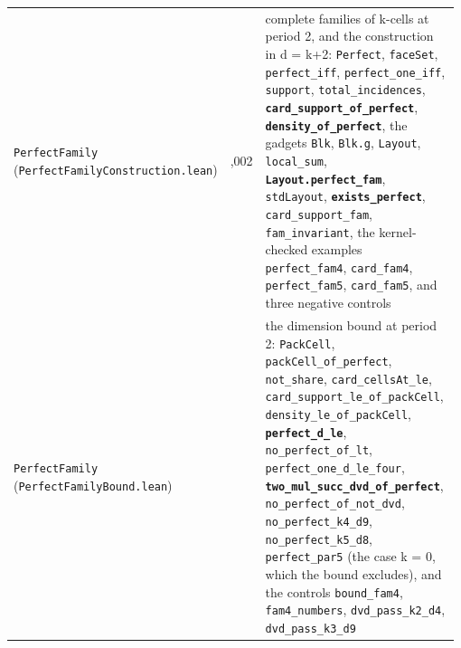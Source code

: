\documentclass[11pt,a4paper]{article}
\theoremstyle{named}
\begin{document}
\begin{small}
\begin{longtable}{>{\raggedright\arraybackslash}p{0.331\linewidth}>{\raggedright\arraybackslash}p{0.05\linewidth}>{\raggedright\arraybackslash}p{0.596\linewidth}}
\texttt{PerfectFamily} (\texttt{PerfectFamilyConstruction.\allowbreak{}lean}) & 1,002 & complete families of k-cells at period 2, and the construction in d = k+2: \texttt{Perfect}, \texttt{faceSet}, \texttt{perfect\_\allowbreak{}iff}, \texttt{perfect\_\allowbreak{}one\_\allowbreak{}iff}, \texttt{support}, \texttt{total\_\allowbreak{}incidences}, \textbf{\texttt{card\_\allowbreak{}support\_\allowbreak{}of\_\allowbreak{}perfect}}, \textbf{\texttt{density\_\allowbreak{}of\_\allowbreak{}perfect}}, the gadgets \texttt{Blk}, \texttt{Blk.\allowbreak{}g}, \texttt{Layout}, \texttt{local\_\allowbreak{}sum}, \textbf{\texttt{Layout.\allowbreak{}perfect\_\allowbreak{}fam}}, \texttt{stdLayout}, \textbf{\texttt{exists\_\allowbreak{}perfect}}, \texttt{card\_\allowbreak{}support\_\allowbreak{}fam}, \texttt{fam\_\allowbreak{}invariant}, the kernel-checked examples \texttt{perfect\_\allowbreak{}fam4}, \texttt{card\_\allowbreak{}fam4}, \texttt{perfect\_\allowbreak{}fam5}, \texttt{card\_\allowbreak{}fam5}, and three negative controls \\
\texttt{PerfectFamily} (\texttt{PerfectFamilyBound.\allowbreak{}lean}) & 642 & the dimension bound at period 2: \texttt{PackCell}, \texttt{packCell\_\allowbreak{}of\_\allowbreak{}perfect}, \texttt{not\_\allowbreak{}share}, \texttt{card\_\allowbreak{}cellsAt\_\allowbreak{}le}, \texttt{card\_\allowbreak{}support\_\allowbreak{}le\_\allowbreak{}of\_\allowbreak{}packCell}, \texttt{density\_\allowbreak{}le\_\allowbreak{}of\_\allowbreak{}packCell}, \textbf{\texttt{perfect\_\allowbreak{}d\_\allowbreak{}le}}, \texttt{no\_\allowbreak{}perfect\_\allowbreak{}of\_\allowbreak{}lt}, \texttt{perfect\_\allowbreak{}one\_\allowbreak{}d\_\allowbreak{}le\_\allowbreak{}four}, \textbf{\texttt{two\_\allowbreak{}mul\_\allowbreak{}succ\_\allowbreak{}dvd\_\allowbreak{}of\_\allowbreak{}perfect}}, \texttt{no\_\allowbreak{}perfect\_\allowbreak{}of\_\allowbreak{}not\_\allowbreak{}dvd}, \texttt{no\_\allowbreak{}perfect\_\allowbreak{}k4\_\allowbreak{}d9}, \texttt{no\_\allowbreak{}perfect\_\allowbreak{}k5\_\allowbreak{}d8}, \texttt{perfect\_\allowbreak{}par5} (the case k = 0, which the bound excludes), and the controls \texttt{bound\_\allowbreak{}fam4}, \texttt{fam4\_\allowbreak{}numbers}, \texttt{dvd\_\allowbreak{}pass\_\allowbreak{}k2\_\allowbreak{}d4}, \texttt{dvd\_\allowbreak{}pass\_\allowbreak{}k3\_\allowbreak{}d9} \\

\end{longtable}
\end{small}
\end{document}
